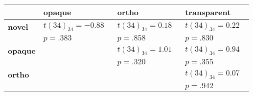 \begin{center}
\begin{tabular}{llll}
\toprule
 & opaque & ortho & transparent \\
\midrule
\textbf{novel} & $t(34)_{34}=-0.88^{    \ \ \ \ }$ & $t(34)_{34}=0.18^{    \ \ \ \ }$ & $t(34)_{34}=0.22^{    \ \ \ \ }$ \\
 & $p=.383$ & $p=.858$ & $p=.830$ \\
\textbf{opaque} &  & $t(34)_{34}=1.01^{    \ \ \ \ }$ & $t(34)_{34}=0.94^{    \ \ \ \ }$ \\
 &  & $p=.320$ & $p=.355$ \\
\textbf{ortho} &  &  & $t(34)_{34}=0.07^{    \ \ \ \ }$ \\
 &  &  & $p=.942$ \\
\bottomrule
\end{tabular}
\end{center}